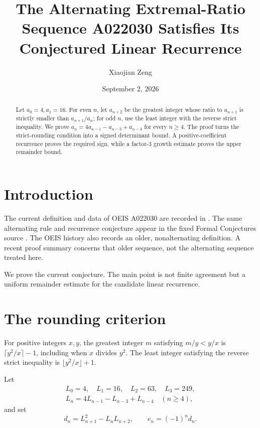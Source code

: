 \documentclass[11pt]{amsart}
\title[A022030 Satisfies Its Linear Recurrence]{The Alternating Extremal-Ratio Sequence A022030 Satisfies Its Conjectured Linear Recurrence}
\author{Xiaojian Zeng}
\date{September 2, 2026}
\theoremstyle{remark}
\begin{document}
\begin{abstract}
Let $a_0=4,a_1=16$.  For even $n$, let $a_{n+2}$ be the greatest integer
whose ratio to $a_{n+1}$ is strictly smaller than $a_{n+1}/a_n$; for odd
$n$, use the least integer with the reverse strict inequality.  We prove
$a_n=4a_{n-1}-a_{n-3}+a_{n-4}$ for every $n\ge4$.  The proof turns the
strict-rounding condition into a signed determinant bound.  A
positive-coefficient recurrence proves the required sign, while a factor-$3$
growth estimate proves the upper remainder bound.
\end{abstract}
\maketitle

\section{Introduction}
The current definition and data of OEIS A022030 are recorded in
\cite{oeisA022030}.  The same alternating rule and recurrence conjecture
appear in the fixed Formal Conjectures source \cite{formalConjectures22030}.
The OEIS history also records an older, nonalternating definition.  A recent
proof summary \cite[Table~1, A022030 row]{adamczewski2026} concerns that older
sequence, not the alternating sequence treated here.

We prove the current conjecture.  The main point is not finite agreement but a
uniform remainder estimate for the candidate linear recurrence.

\section{The rounding criterion}
For positive integers $x,y$, the greatest integer $m$ satisfying $m/y<y/x$
is $\lceil y^2/x\rceil-1$, including when $x$ divides $y^2$.  The least
integer satisfying the reverse strict inequality is $\lfloor y^2/x\rfloor+1$.

Let
\begin{equation}\label{eq:Lrec}
 \begin{gathered}
 L_0=4,\quad L_1=16,\quad L_2=63,\quad L_3=249,\\
 L_n=4L_{n-1}-L_{n-3}+L_{n-4}\quad(n\ge4),
 \end{gathered}
\end{equation}
and set
\begin{equation}\label{eq:defect}
 d_n=L_{n+1}^2-L_nL_{n+2},\qquad e_n=(-1)^n d_n.
\end{equation}
\end{document}
